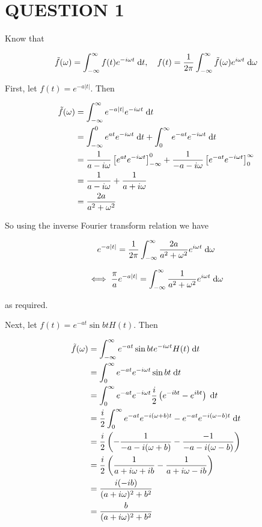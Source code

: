 \documentclass[a4paper]{article}
\begin{document}
	
\maketitle

\section{QUESTION 1}

Know that 

\[ \tilde{f}(\omega) = \int_{-\infty}^{\infty} f(t) e^{-i \omega t} \; \mathrm{d} t, \quad f(t) = \frac{1}{2 \pi} \int_{-\infty}^{\infty} \tilde{f}(\omega) e^{i \omega t} \; \mathrm{d} \omega  \]

First, let $ f(t) = e^{-  a | t |} $. Then

\begin{align*}
\tilde{f}(\omega) & = \int_{-\infty}^{\infty} e^{-a | t |} e^{-i \omega t} \; \mathrm{d} t \\
& =  \int_{-\infty}^{0} e^{ a t } e^{-i \omega t} \; \mathrm{d} t + \int_{0}^{\infty} e^{- a t } e^{-i \omega t} \; \mathrm{d} t \\
& = \frac{1}{a - i \omega } \left[   e^{ a t } e^{-i \omega t} \right]_{-\infty}^{0} + \frac{1}{-a - i \omega } \left[ e^{ - a t } e^{-i \omega t} \right]_{0}^{\infty} \\
& = \frac{1}{a - i \omega} + \frac{1}{a + i \omega} \\
& = \frac{2a}{a^{2} + \omega^{2}}
\end{align*}

So using the inverse Fourier transform relation we have

\[ e^{-  a | t |} = \frac{1}{2 \pi} \int_{-\infty}^{\infty} \frac{2a}{a^{2} + \omega^{2}} e^{i \omega t} \; \mathrm{d} \omega \]

\[ \iff \frac{\pi}{a} e^{-  a | t |} = \int_{-\infty}^{\infty} \frac{1}{a^{2} + \omega^{2}} e^{i \omega t} \; \mathrm{d} \omega  \]

as required.

Next, let $ f(t) = e^{-at} \sin bt H(t) $. Then 


\begin{align*}
\tilde{f}(\omega) & = \int_{-\infty}^{\infty} e^{-at} \sin bt e^{-i \omega t} H(t) \; \mathrm{d} t \\
& = \int_{0}^{\infty} e^{-at} e^{-i \omega t} \sin bt \; \mathrm{d} t \\
& = \int_{0}^{\infty} e^{-at} e^{-i \omega t} \frac{i}{2} \left(  e^{-i b t} - e^{i b t} \right)  \; \mathrm{d} t \\
& = \frac{i}{2}  \int_{0}^{\infty}  e^{-at}e^{-i(\omega + b)t}   -  e^{-at}e^{-i(\omega - b)t}   \; \mathrm{d} t \\
& = \frac{i}{2} \left(  -  \frac{1}{-a -i(\omega + b)} - \frac{-1}{-a - i(\omega - b)} \right) \\
& =  \frac{i}{2} \left(  \frac{1}{a + i\omega + ib} - \frac{1}{a + i \omega - ib} \right) \\
& = \frac{i( - i b )}{(a + i \omega)^{2} + b^{2} } \\
& = \frac{b}{(a + i \omega)^{2} + b^{2} }
\end{align*}
\end{document}
